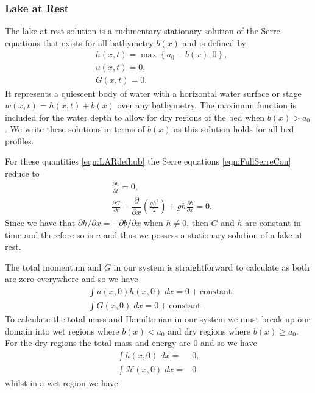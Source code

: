 \subsubsection{Lake at Rest}
The lake at rest solution is a rudimentary stationary solution of the Serre equations that exists for all bathymetry $b(x)$ and is defined by
\begin{subequations}
	\begin{align}
	&h(x,t) = \max\left\lbrace a_0 - b(x), 0 \right\rbrace, \\
	&u(x,t) = 0 , \\
	&G(x,t) = 0 .
	\end{align}
	\label{eqn:LARdefhub}
\end{subequations}
It represents a quiescent body of water with a horizontal water surface or stage $w(x,t) = h(x,t) + b(x)$ over any bathymetry. The maximum function is included for the water depth to allow for dry regions of the bed when $b(x) > a_0$. We write these solutions in terms of $b(x)$ as this solution holds for all bed profiles. 

For these quantities \eqref{eqn:LARdefhub} the Serre equations \eqref{eqn:FullSerreCon} reduce to
\begin{align*}
& \frac{\partial h}{\partial t}  = 0 , \\
&\frac{\partial G}{\partial t}  +\dfrac{\partial}{\partial x} \left(\frac{gh^2}{2}\right) + gh \frac{\partial b}{\partial x} = 0.
\end{align*}
Since we have that $\partial h / \partial x =  - \partial b / \partial x$ when $h \neq 0$, then $G$ and $h$ are constant in time and therefore so is $u$ and thus we possess a stationary solution of a lake at rest. 
  
The total momentum and $G$ in our system is straightforward to calculate as both are zero everywhere and so we have 
\begin{align}
&\int u(x,0)h(x,0) \;  dx = {} 0 + \text{constant}, \\
&\int G(x,0) \; dx = {} 0 + \text{constant}.
\end{align}
To calculate the total mass and Hamiltonian in our system we must break up our domain into wet regions where $b(x) < a_0$ and dry regions where $b(x) \ge a_0$. For the dry regions the total mass and energy are $0$ and so we have 
 \begin{subequations}
 	\begin{align}
 	\int h(x,0) \; dx = {} & 0 , \\
 	\int \mathcal{H}(x,0) \; dx = {} & 0
 	\end{align}
 \end{subequations}
 whilst in a wet region we have 
 
